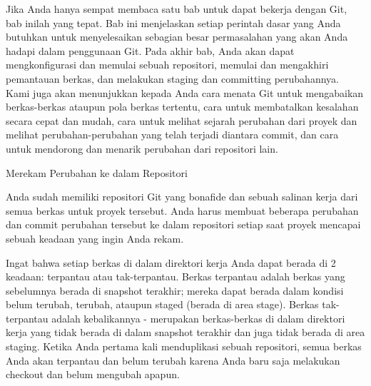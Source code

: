 \vspace{14pt}
\noindent 
{\fontsize{14pt}{14pt}\selectfont Jika Anda hanya sempat membaca satu bab untuk dapat bekerja dengan Git, bab inilah yang tepat. Bab ini menjelaskan setiap perintah dasar yang Anda butuhkan untuk menyelesaikan sebagian besar permasalahan yang akan Anda hadapi dalam penggunaan Git. Pada akhir bab, Anda akan dapat mengkonfigurasi dan memulai sebuah repositori, memulai dan mengakhiri pemantauan berkas, dan melakukan staging dan committing perubahannya. Kami juga akan menunjukkan kepada Anda cara menata Git untuk mengabaikan berkas-berkas ataupun pola berkas tertentu, cara untuk membatalkan kesalahan secara cepat dan mudah, cara untuk melihat sejarah perubahan dari proyek dan melihat perubahan-perubahan yang telah terjadi diantara commit, dan cara untuk mendorong dan menarik perubahan dari repositori lain. \\} \par
\vspace{14pt}
\noindent 
{\fontsize{14pt}{14pt}\selectfont Merekam Perubahan ke dalam Repositori \\} \par
\noindent 
{\fontsize{14pt}{14pt}\selectfont Anda sudah memiliki repositori Git yang bonafide dan sebuah salinan kerja dari semua berkas untuk proyek tersebut. Anda harus membuat beberapa perubahan dan commit perubahan tersebut ke dalam repositori setiap saat proyek mencapai sebuah keadaan yang ingin Anda rekam. \\} \par
\noindent 
{\fontsize{14pt}{14pt}\selectfont Ingat bahwa setiap berkas di dalam direktori kerja Anda dapat berada di 2 keadaan: terpantau atau tak-terpantau. Berkas terpantau adalah berkas yang sebelumnya berada di snapshot terakhir; mereka dapat berada dalam kondisi belum terubah, terubah, ataupun staged (berada di area stage). Berkas tak-terpantau adalah kebalikannya - merupakan berkas-berkas di dalam direktori kerja yang tidak berada di dalam snapshot terakhir dan juga tidak berada di area staging. Ketika Anda pertama kali menduplikasi sebuah repositori, semua berkas Anda akan terpantau dan belum terubah karena Anda baru saja melakukan checkout dan belum mengubah apapun. \\} \par

